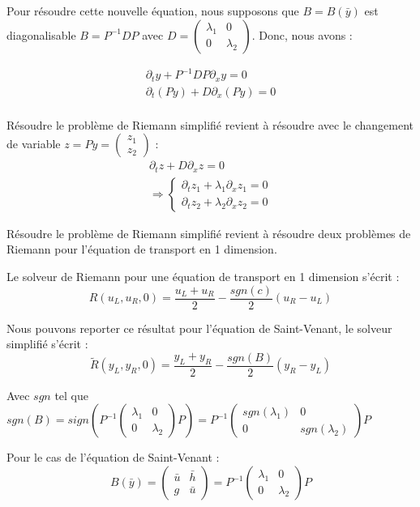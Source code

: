 \documentclass{article}
\begin{document}
Pour résoudre cette nouvelle équation, nous supposons que $B=B(\bar{y})$ est diagonalisable $B = P^{-1} D P$ avec $D = \begin{pmatrix} \lambda_1 & 0 \\ 0 & \lambda_2 \end{pmatrix}$.
Donc, nous avons :

\begin{eqnarray*}
    \partial_t y + P^{-1} D P \partial_x y = 0 \\
    \partial_t (Py) + D \partial_x (Py) = 0 \\
\end{eqnarray*}

Résoudre le problème de Riemann simplifié revient à résoudre avec le changement de variable $z = Py = \begin{pmatrix} z_1 \\ z_2 \end{pmatrix}$ :
\begin{eqnarray*}
\partial_t z + D \partial_x z = 0 \\
\Longrightarrow \left\{ \begin{matrix} \partial_t z_1 + \lambda_1 \partial_x z_1 = 0 \\
                        \partial_t z_2 + \lambda_2 \partial_x z_2 = 0
        \end{matrix} \right.
\end{eqnarray*}

Résoudre le problème de Riemann simplifié revient à résoudre deux problèmes de Riemann pour l'équation de transport en 1 dimension.

Le solveur de Riemann pour une équation de transport en 1 dimension s'écrit :
\[ R(u_L, u_R, 0) = \frac{u_L+u_R}{2} - \frac{sgn(c)}{2} (u_R-u_L) \]

Nous pouvons reporter ce résultat pour l'équation de Saint-Venant, le solveur simplifié s'écrit : 
\[ \tilde{R}(y_L, y_R, 0) = \frac{y_L+y_R}{2} - \frac{sgn(B)}{2} (y_R-y_L) \]

Avec $sgn$ tel que $sgn(B) = sign(P^{-1} \begin{pmatrix} \lambda_1 & 0 \\ 0 & \lambda_2 \end{pmatrix} P) = P^{-1} \begin{pmatrix} sgn(\lambda_1) & 0 \\ 0 & sgn(\lambda_2) \end{pmatrix} P$
\newline

Pour le cas de l'équation de Saint-Venant :
\[ B(\bar{y}) = \begin{pmatrix} \bar{u} & \bar{h} \\ g & \bar{u} \end{pmatrix} = P^{-1} \begin{pmatrix} \lambda_1 & 0 \\ 0 & \lambda_2 \end{pmatrix} P \]
\end{document}

